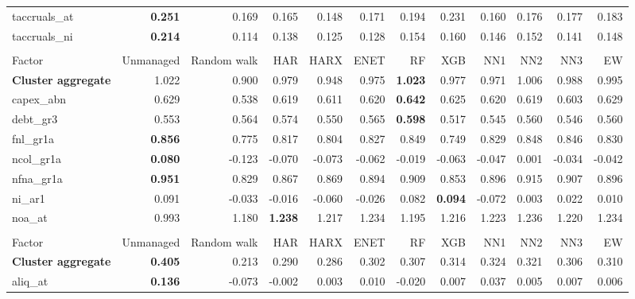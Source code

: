 \begin{landscape}
\begin{longtable}{>{\raggedright\arraybackslash}p{2.6cm}rrrrrrrrrrr}
taccruals\_at & \textbf{0.251} & 0.169 & 0.165 & 0.148 & 0.171 & 0.194 & 0.231 & 0.160 & 0.176 & 0.177 & 0.183 \\
taccruals\_ni & \textbf{0.214} & 0.114 & 0.138 & 0.125 & 0.128 & 0.154 & 0.160 & 0.146 & 0.152 & 0.141 & 0.148 \\
\hline
\multicolumn{12}{@{}l}{\textit{Panel B. Debt Issuance}} \\
\hline
Factor & Unmanaged & Random walk & HAR & HARX & ENET & RF & XGB & NN1 & NN2 & NN3 & EW \\
\hline
\textbf{Cluster aggregate} & 1.022 & 0.900 & 0.979 & 0.948 & 0.975 & \textbf{\cellcolor{blue!10}1.023} & 0.977 & 0.971 & 1.006 & 0.988 & 0.995 \\
capex\_abn & 0.629 & 0.538 & 0.619 & 0.611 & 0.620 & \textbf{\cellcolor{blue!10}0.642} & 0.625 & 0.620 & 0.619 & 0.603 & \cellcolor{blue!10}0.629 \\
debt\_gr3 & 0.553 & 0.564 & \cellcolor{blue!10}0.574 & 0.550 & \cellcolor{blue!10}0.565 & \textbf{\cellcolor{blue!10}0.598} & 0.517 & 0.545 & 0.560 & 0.546 & 0.560 \\
fnl\_gr1a & \textbf{0.856} & 0.775 & 0.817 & 0.804 & 0.827 & 0.849 & 0.749 & 0.829 & 0.848 & 0.846 & 0.830 \\
ncol\_gr1a & \textbf{0.080} & -0.123 & -0.070 & -0.073 & -0.062 & -0.019 & -0.063 & -0.047 & 0.001 & -0.034 & -0.042 \\
nfna\_gr1a & \textbf{0.951} & 0.829 & 0.867 & 0.869 & 0.894 & 0.909 & 0.853 & 0.896 & 0.915 & 0.907 & 0.896 \\
ni\_ar1 & 0.091 & -0.033 & -0.016 & -0.060 & -0.026 & 0.082 & \textbf{\cellcolor{blue!10}0.094} & -0.072 & 0.003 & 0.022 & 0.010 \\
noa\_at & 0.993 & 1.180 & \textbf{\cellcolor{blue!10}1.238} & \cellcolor{blue!10}1.217 & \cellcolor{blue!10}1.234 & \cellcolor{blue!10}1.195 & \cellcolor{blue!10}1.216 & \cellcolor{blue!10}1.223 & \cellcolor{blue!10}1.236 & \cellcolor{blue!10}1.220 & \cellcolor{blue!10}1.234 \\
\hline
\multicolumn{12}{@{}l}{\textit{Panel C. Investment}} \\
\hline
Factor & Unmanaged & Random walk & HAR & HARX & ENET & RF & XGB & NN1 & NN2 & NN3 & EW \\
\hline
\textbf{Cluster aggregate} & \textbf{0.405} & 0.213 & 0.290 & 0.286 & 0.302 & 0.307 & 0.314 & 0.324 & 0.321 & 0.306 & 0.310 \\
aliq\_at & \textbf{0.136} & -0.073 & -0.002 & 0.003 & 0.010 & -0.020 & 0.007 & 0.037 & 0.005 & 0.007 & 0.006 \\

\end{longtable}
\end{landscape}

